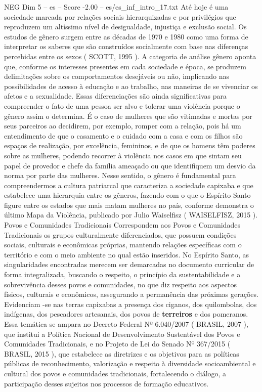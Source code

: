 \begin{textsample}{NEG Dim 5 – es – Score -2.00 – es/es\_inf\_intro\_17.txt}
Até hoje é uma sociedade marcada por relações sociais hierarquizadas e por privilégios que reproduzem um altíssimo nível de desigualdade, injustiça e exclusão social.
Os estudos de gênero surgem entre as décadas de 1970 e 1980 como uma forma de interpretar os saberes que são construídos socialmente com base nas diferenças percebidas entre os sexos ( SCOTT, 1995 ).
A categoria de análise gênero aponta que, conforme os interesses presentes em cada sociedade e época, se produzem delimitações sobre os comportamentos desejáveis ou não, implicando nas possibilidades de acesso à educação e ao trabalho, nas maneiras de se vivenciar os afetos e a sexualidade.
Essas diferenciações são ainda significativas para compreender o fato de uma pessoa ser alvo e tolerar uma violência porque o gênero assim o determina.
É o caso de mulheres que são vitimadas e mortas por seus parceiros ao decidirem, por exemplo, romper com a relação, pois há um entendimento de que o casamento e o cuidado com a casa e com os filhos são espaços de realização, por excelência, femininos, e de que os homens têm poderes sobre as mulheres, podendo recorrer à violência nos casos em que sintam seu papel de provedor e chefe da família ameaçado ou que identifiquem um desvio da norma por parte das mulheres.
Nesse sentido, o gênero é fundamental para compreendermos a cultura patriarcal que caracteriza a sociedade capixaba e que estabelece uma hierarquia entre os gêneros, fazendo com o que o Espírito Santo figure entre os estados que mais matam mulheres no país, conforme demonstra o último Mapa da Violência, publicado por Julio Waiselfisz ( WAISELFISZ, 2015 ).
Povos e Comunidades Tradicionais Correspondem aos Povos e Comunidades Tradicionais os grupos culturalmente diferenciados, que possuem condições sociais, culturais e econômicas próprias, mantendo relações específicas com o território e com o meio ambiente no qual estão inseridos.
No Espírito Santo, as singularidades encontradas merecem ser demarcadas no documento curricular de forma integralizada, buscando o respeito, o princípio da sustentabilidade e a sobrevivência desses povos e comunidades, no que diz respeito aos aspectos físicos, culturais e econômicos, assegurando a permanência das próximas gerações.
Evidenciam -se nas terras capixabas a presença dos ciganos, dos quilombolas, dos indígenas, dos pescadores artesanais, dos povos de \textbf{terreiros} e dos pomeranos.
Essa temática se ampara no Decreto Federal Nº 6.040/2007 ( BRASIL, 2007 ), que institui a Política Nacional de Desenvolvimento Sustentável dos Povos e Comunidades Tradicionais, e no Projeto de Lei do Senado Nº 367/2015 ( BRASIL, 2015 ), que estabelece as diretrizes e os objetivos para as políticas públicas de reconhecimento, valorização e respeito à diversidade socioambiental e cultural dos povos e comunidades tradicionais, fortalecendo o diálogo, a participação desses sujeitos nos processos de formação educativos.

\end{textsample}
